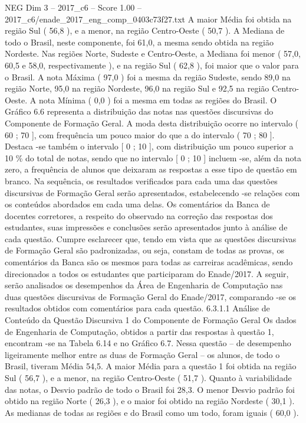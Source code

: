 \begin{textsample}{NEG Dim 3 – 2017\_c6 – Score 1.00 – 2017\_c6/enade\_2017\_eng\_comp\_0403c73f27.txt}
A maior Média foi obtida na região Sul ( 56,8 ), e a menor, na região Centro-Oeste ( 50,7 ).
A Mediana de todo o Brasil, neste componente, foi 61,0, a mesma sendo obtida na região Nordeste.
Nas regiões Norte, Sudeste e Centro-Oeste, a Mediana foi menor ( 57,0, 60,5 e 58,0, respectivamente ), e na região Sul ( 62,8 ), foi maior que o valor para o Brasil.
A nota Máxima ( 97,0 ) foi a mesma da região Sudeste, sendo 89,0 na região Norte, 95,0 na região Nordeste, 96,0 na região Sul e 92,5 na região Centro-Oeste.
A nota Mínima ( 0,0 ) foi a mesma em todas as regiões do Brasil.
O Gráfico 6.6 representa a distribuição das notas nas questões discursivas do Componente de Formação Geral.
A moda desta distribuição ocorre no intervalo ( 60 ; 70 ], com frequência um pouco maior do que a do intervalo ( 70 ; 80 ].
Destaca -se também o intervalo [ 0 ; 10 ], com distribuição um pouco superior a 10 \% do total de notas, sendo que no intervalo [ 0 ; 10 ] incluem -se, além da nota zero, a frequência de alunos que deixaram as respostas a esse tipo de questão em branco.
Na sequência, os resultados verificados para cada uma das questões discursivas de Formação Geral serão apresentados, estabelecendo -se relações com os conteúdos abordados em cada uma delas.
Os comentários da Banca de docentes corretores, a respeito do observado na correção das respostas dos estudantes, suas impressões e conclusões serão apresentados junto à análise de cada questão.
Cumpre esclarecer que, tendo em vista que as questões discursivas de Formação Geral são padronizadas, ou seja, constam de todas as provas, os comentários da Banca são os mesmos para todas as carreiras acadêmicas, sendo direcionados a todos os estudantes que participaram do Enade/2017.
A seguir, serão analisados os desempenhos da Área de Engenharia de Computação nas duas questões discursivas de Formação Geral do Enade/2017, comparando -se os resultados obtidos com comentários para cada questão. 6.3.1.1 Análise de Conteúdo da Questão Discursiva 1 do Componente de Formação Geral Os dados de Engenharia de Computação, obtidos a partir das respostas à questão 1, encontram -se na Tabela 6.14 e no Gráfico 6.7.
Nessa questão – de desempenho ligeiramente melhor entre as duas de Formação Geral – os alunos, de todo o Brasil, tiveram Média 54,5.
A maior Média para a questão 1 foi obtida na região Sul ( 56,7 ), e a menor, na região Centro-Oeste ( 51,7 ).
Quanto à variabilidade das notas, o Desvio padrão de todo o Brasil foi 28,3.
O menor Desvio padrão foi obtido na região Norte ( 26,3 ), e o maior foi obtido na região Nordeste ( 30,1 ).
As medianas de todas as regiões e do Brasil como um todo, foram iguais ( 60,0 ).

\end{textsample}
